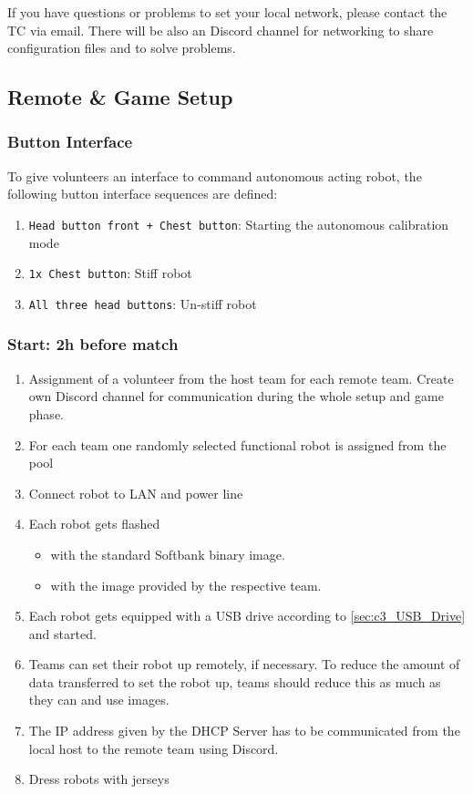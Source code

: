 If you have questions or problems to set your local network, please contact the TC via email. There will be also an Discord channel for networking to share configuration files and to solve problems.

\subsection{Remote \& Game Setup}

\subsubsection{Button Interface}
To give volunteers an interface to command autonomous acting robot, the following button interface sequences are defined:
\begin{enumerate}
	\item \texttt{Head button front + Chest button}: Starting the autonomous calibration mode
	\item \texttt{1x Chest button}: Stiff robot
	\item \texttt{All three head buttons}: Un-stiff robot
\end{enumerate} 

\subsubsection{Start: 2h before match}

    \begin{enumerate}
        \item Assignment of a volunteer from the host team for each remote team. Create own Discord channel for communication during the whole setup and game phase.
		\item For each team one randomly selected functional robot is assigned from the pool
        \item Connect robot to LAN and power line
        \item Each robot gets flashed 
        \begin{itemize}
            \item with the standard Softbank binary image.
            \item with the image provided by the respective team.
		\end{itemize}
		\item Each robot gets equipped with a USB drive according to \ref{sec:c3_USB_Drive} and started.
        \item Teams can set their robot up remotely, if necessary. To reduce the amount of data transferred to set the robot up, teams should reduce this as much as they can and use images.
        \item The IP address given by the DHCP Server has to be communicated from the local host to the remote team using Discord.
        \item Dress robots with jerseys
    \end{enumerate}

